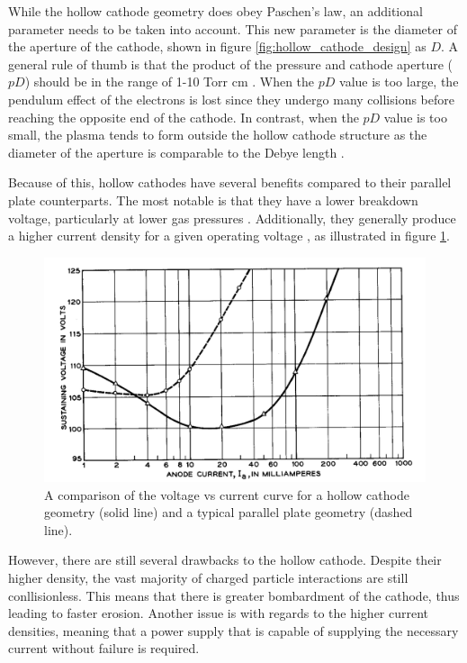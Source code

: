  While the hollow cathode geometry does obey Paschen's law, an additional parameter needs to be taken into account. This new parameter is the diameter of the aperture of the cathode, shown in figure \ref{fig:hollow_cathode_design} as $D$. A general rule of thumb is that the product of the pressure and cathode aperture ($pD$) should be in the range of 1-10 Torr cm \cite{watson_gewartewski_1965}. When the $pD$ value is too large, the pendulum effect of the electrons is lost since they undergo many collisions before reaching the opposite end of the cathode. In contrast, when the $pD$ value is too small, the plasma tends to form outside the hollow cathode structure as the diameter of the aperture is comparable to the Debye length \cite{Iza2008}.
 
 Because of this, hollow cathodes have several benefits compared to their parallel plate counterparts. The most notable is that they have a lower breakdown voltage, particularly at lower gas pressures \cite{Kolobov2015, Eichhorn1993}. Additionally, they generally produce a higher current density for a given operating voltage \cite{Kolobov2015, Pillow1981}, as illustrated in figure \ref{fig:current_density_hollow_cathode}. 

\begin{figure}[h!]
	\centering
	\includegraphics[width=0.95\linewidth]{chapter_2/figures/current_density_hollow_cathode.png}
	\caption{A comparison of the voltage vs current curve for a hollow cathode geometry (solid line) and a typical parallel plate geometry (dashed line)\cite{watson_gewartewski_1965}.}
	\label{fig:current_density_hollow_cathode}
\end{figure}

However, there are still several drawbacks to the hollow cathode. Despite their higher density, the vast majority of charged particle interactions are still conllisionless. This means that there is greater bombardment of the cathode, thus leading to faster erosion. Another issue is with regards to the higher current densities, meaning that a power supply that is capable of supplying the necessary current without failure is required.

